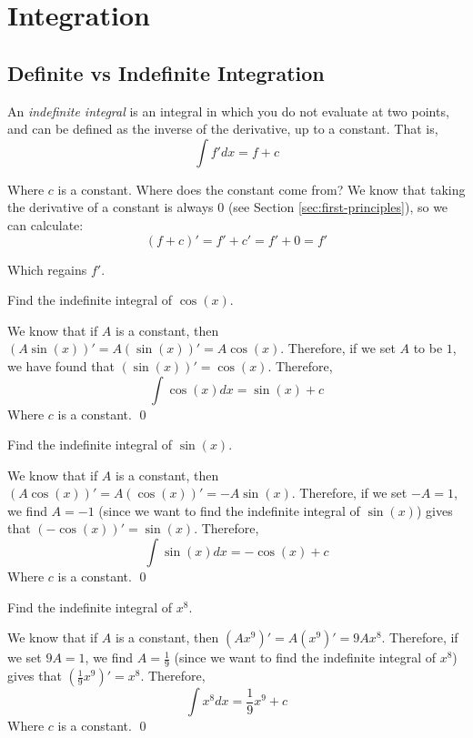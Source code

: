 \section{Integration}
\subsection{Definite vs Indefinite Integration}
An \emph{indefinite integral} is an integral in which you do not evaluate at two points, and can be defined as the inverse of the derivative, up to a constant. That is,
\[ \int f' dx = f + c\]

Where $c$ is a constant. Where does the constant come from? We know that taking the derivative of a constant is always $0$ (see Section \ref{sec:first-principles}), 
so we can calculate:
\[ (f+c)' = f' + c' = f' + 0 = f'\]

Which regains $f'$.

\begin{example} \label{ex:int-cosx}
    Find the indefinite integral of $\cos (x)$.
\end{example}
\begin{solution}
    We know that if $A$ is a constant, then $ (A \sin (x))' = A (\sin (x))' = A \cos (x)$. Therefore, if we set $A$ to be $1$, 
    we have found that $(\sin (x))' = \cos (x)$. Therefore,
    \[ \int \cos(x) dx = \sin (x) + c\]
    Where $c$ is a constant. 
    \qed
\end{solution}

\begin{example}\label{ex:int-sinx}
    Find the indefinite integral of $\sin (x)$.
\end{example}
\begin{solution}
    We know that if $A$ is a constant, then $ (A \cos (x))' = A (\cos (x))' = -A \sin (x)$. Therefore, if we set $-A = 1$, we find 
    $A=-1$ (since we want to find the indefinite integral of $\sin(x)$) gives that $(-\cos (x))' = \sin (x)$. Therefore,
    \[ \int \sin(x) dx = -\cos (x) + c\]
    Where $c$ is a constant.
    \qed
\end{solution}

\begin{example}\label{ex:int-x18}
    Find the indefinite integral of $x^8$.
\end{example}
\begin{solution}
    We know that if $A$ is a constant, then $ (A x^9)' = A (x^9)' = 9A x^8$. Therefore, if we set $9A = 1$, we find 
    $A=\frac{1}{9}$ (since we want to find the indefinite integral of $x^8$) gives that $(\frac{1}{9} x^9)' = x^8$. Therefore,
    \[ \int x^8 dx = \frac{1}{9} x^9 + c\]
    Where $c$ is a constant.
    \qed
\end{solution}


